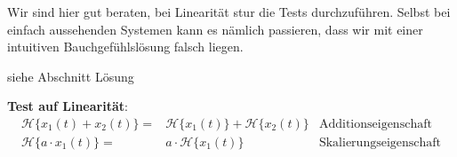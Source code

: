 \documentclass[11pt,a4paper,DIV=12]{scrartcl}
\numberwithin{equation}{section}
\numberwithin{figure}{section}
\newcommand{\sysH}[1]{\mathcal{H}{\{#1\}}}
\begin{document}
\begin{Ansatz}
Wir sind hier gut beraten, bei Linearität stur die Tests durchzuführen.
Selbst bei einfach aussehenden Systemen kann es nämlich passieren, dass wir mit
einer intuitiven Bauchgefühlslösung falsch liegen.
\end{Ansatz}
\begin{ExCalc}
siehe Abschnitt Lösung
\end{ExCalc}


\begin{Loesung}
\textbf{Test auf Linearität}:
\begin{align}
\sysH{x_1(t) + x_2(t)} =& \sysH{x_1(t)} + \sysH{x_2(t)} &\text{Additionseigenschaft}\\
\sysH{a \cdot x_1(t)} =& a \cdot \sysH{x_1(t)} &\text{Skalierungseigenschaft}
\end{align}


\end{Loesung}
\end{document}
